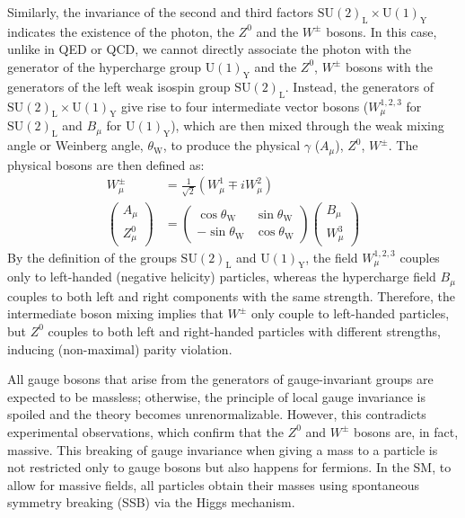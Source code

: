 Similarly, the invariance of the second and third factors $\text{SU}(2)_{\text{L}}\times \text{U}(1)_{\text{Y}}$ indicates the existence of the photon, the $Z^{0}$ and the $W^{\pm}$ bosons. In this case, unlike in QED or QCD, we cannot directly associate the photon with the generator of the hypercharge group $\text{U}(1)_{\text{Y}}$ and the $Z^{0}$, $W^{\pm}$ bosons with the generators of the left weak isospin group $\text{SU}(2)_{\text{L}}$. Instead, the generators of $\text{SU}(2)_{\text{L}}\times \text{U}(1)_{\text{Y}}$ give rise to four intermediate vector bosons ($W_\mu^{1,2,3}$ for $\text{SU}(2)_{\text{L}}$ and $B_\mu$ for $\text{U}(1)_{\text{Y}}$), which are then mixed through the weak mixing angle or Weinberg angle, $\theta_{\text{W}}$, to produce the physical $\gamma$ ($A_\mu$), $Z^{0}$, $W^{\pm}$. The physical bosons are then defined as:
\begin{align*}
    W_\mu^{\pm} &= \frac{1}{\sqrt{2}}(W_\mu^{1}\mp iW_\mu^{2})\\
    \begin{pmatrix}
        A_\mu \\
        Z^{0}_\mu
    \end{pmatrix}
    &=
    \begin{pmatrix}
        \cos{\theta_{\text{W}}} & \sin{\theta_{\text{W}}} \\
        -\sin{\theta_{\text{W}}} & \cos{\theta_{\text{W}}}
    \end{pmatrix}
    \begin{pmatrix}
        B_\mu \\
        W^{3}_\mu
    \end{pmatrix}
\end{align*}
By the definition of the groups $\text{SU}(2)_{\text{L}}$ and $\text{U}(1)_{\text{Y}}$, the field $W_\mu^{1,2,3}$ couples only to left-handed (negative helicity) particles, whereas the hypercharge field $B_\mu$ couples to both left and right components with the same strength. Therefore, the intermediate boson mixing implies that $W^{\pm}$ only couple to left-handed particles, but $Z^{0}$ couples to both left and right-handed particles with different strengths, inducing (non-maximal) parity violation.

All gauge bosons that arise from the generators of gauge-invariant groups are expected to be massless; otherwise, the principle of local gauge invariance is spoiled and the theory becomes unrenormalizable. However, this contradicts experimental observations, which confirm that the $Z^{0}$ and $W^{\pm}$ bosons are, in fact, massive. This breaking of gauge invariance when giving a mass to a particle is not restricted only to gauge bosons but also happens for fermions. In the SM, to allow for massive fields, all particles obtain their masses using spontaneous symmetry breaking (SSB) via the Higgs mechanism.

